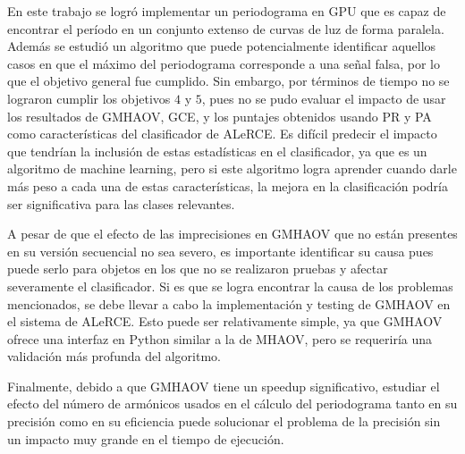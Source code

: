 En este trabajo se logró implementar un periodograma en GPU que es capaz de encontrar el período en un conjunto extenso de curvas de luz de forma paralela. Además se estudió un algoritmo que puede potencialmente identificar aquellos casos en que el máximo del periodograma corresponde a una señal falsa, por lo que el objetivo general fue cumplido. Sin embargo, por términos de tiempo no se lograron cumplir los objetivos $4$ y $5$, pues no se pudo evaluar el impacto de usar los resultados de GMHAOV, GCE, y los puntajes obtenidos usando PR y PA como características del clasificador de ALeRCE. Es difícil predecir el impacto que tendrían la inclusión de estas estadísticas en el clasificador, ya que es un algoritmo de machine learning, pero si este algoritmo logra aprender cuando darle más peso a cada una de estas características, la mejora en la clasificación podría ser significativa para las clases relevantes.

A pesar de que el efecto de las imprecisiones en GMHAOV que no están presentes en su versión secuencial no sea severo, es importante identificar su causa pues puede serlo para objetos en los que no se realizaron pruebas y afectar severamente el clasificador. Si es que se logra encontrar la causa de los problemas mencionados, se debe llevar a cabo la implementación y testing de GMHAOV en el sistema de ALeRCE. Esto puede ser relativamente simple, ya que GMHAOV ofrece una interfaz en Python similar a la de MHAOV, pero se requeriría una validación más profunda del algoritmo.

Finalmente, debido a que GMHAOV tiene un speedup significativo, estudiar el efecto del número de armónicos usados en el cálculo del periodograma tanto en su precisión como en su eficiencia puede solucionar el problema de la precisión sin un impacto muy grande en el tiempo de ejecución.


